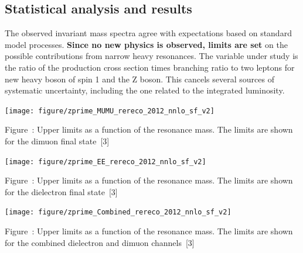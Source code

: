 \documentclass[a0b,portrait,preview]{a0poster}
\begin{document}
\begin{multicols}{3}
{\red \section*{\bf Statistical analysis and results}}
The observed invariant mass spectra agree with expectations based on standard model processes.
\textbf{Since no new physics is observed, limits are set} on the possible contributions from narrow heavy resonances.
The variable under study is the ratio of the production cross section times branching ratio to two leptons for new heavy boson of spin 1 and the Z boson.
This cancels several sources of systematic uncertainty, including the one related to the integrated luminosity.

\begin{minipage}{\figwidth}
\vspace{1.2cm}
\unitlength=1cm
\begin{center}
{\texttt{[image: figure/zprime\_MUMU\_rereco\_2012\_nnlo\_sf\_v2]}}
\newline
\addtocounter{figscount}{1} 
{\small \captcolor Figure~: Upper limits as a function of the resonance mass. The limits are shown for the dimuon final state~[3]}
\end{center}
\label{mass}
\end{minipage}

\begin{minipage}{\figwidth}
\vspace{1.0cm}
\unitlength=1cm
\begin{center}
{\texttt{[image: figure/zprime\_EE\_rereco\_2012\_nnlo\_sf\_v2]}}
\newline
\addtocounter{figscount}{1} 
{\small \captcolor Figure~: Upper limits as a function of the resonance mass. The limits are shown for the dielectron final state~[3]}
\end{center}
\label{mass}
\end{minipage}

\begin{minipage}{\figwidth}
\vspace{1.0cm}
\unitlength=1cm
\begin{center}
{\texttt{[image: figure/zprime\_Combined\_rereco\_2012\_nnlo\_sf\_v2]}}
\newline
\addtocounter{figscount}{1} 
{\small \captcolor Figure~: 
Upper limits as a function of the resonance mass. The limits are shown for the combined dielectron and dimuon channels~[3]}
\end{center}
\label{mass}
\vspace{1cm}
\end{minipage}


\end{multicols}
\end{document}

